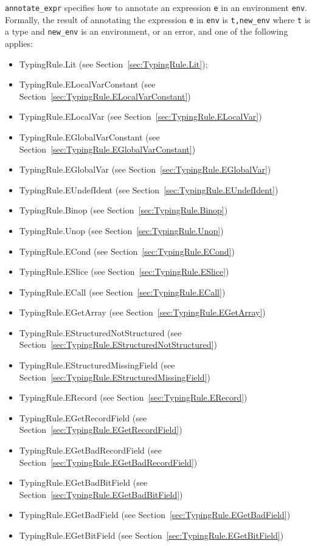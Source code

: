 \documentclass{book}
\begin{document}
\texttt{annotate\_expr} specifies how to annotate an expression \texttt{e} in
an environment \texttt{env}.  Formally, the result of annotating the expression
\texttt{e} in \texttt{env} is \texttt{t,new\_env} where \texttt{t} is a type and
\texttt{new\_env} is an environment, or an error, and one of the following applies:
\begin{itemize}
\item TypingRule.Lit (see Section~\ref{sec:TypingRule.Lit});
\item TypingRule.ELocalVarConstant (see Section~\ref{sec:TypingRule.ELocalVarConstant})
\item TypingRule.ELocalVar (see Section~\ref{sec:TypingRule.ELocalVar})
\item TypingRule.EGlobalVarConstant (see Section~\ref{sec:TypingRule.EGlobalVarConstant})
\item TypingRule.EGlobalVar (see Section~\ref{sec:TypingRule.EGlobalVar})
\item TypingRule.EUndefIdent (see Section~\ref{sec:TypingRule.EUndefIdent})
\item TypingRule.Binop (see Section~\ref{sec:TypingRule.Binop})
\item TypingRule.Unop (see Section~\ref{sec:TypingRule.Unop})
\item TypingRule.ECond (see Section~\ref{sec:TypingRule.ECond})
\item TypingRule.ESlice (see Section~\ref{sec:TypingRule.ESlice})
\item TypingRule.ECall (see Section~\ref{sec:TypingRule.ECall})
\item TypingRule.EGetArray (see Section~\ref{sec:TypingRule.EGetArray})
\item TypingRule.EStructuredNotStructured (see Section~\ref{sec:TypingRule.EStructuredNotStructured})
\item TypingRule.EStructuredMissingField (see Section~\ref{sec:TypingRule.EStructuredMissingField})
\item TypingRule.ERecord (see Section~\ref{sec:TypingRule.ERecord})
\item TypingRule.EGetRecordField (see Section~\ref{sec:TypingRule.EGetRecordField})
\item TypingRule.EGetBadRecordField (see Section~\ref{sec:TypingRule.EGetBadRecordField})
\item TypingRule.EGetBadBitField (see Section~\ref{sec:TypingRule.EGetBadBitField})
\item TypingRule.EGetBadField (see Section~\ref{sec:TypingRule.EGetBadField})
\item TypingRule.EGetBitField (see Section~\ref{sec:TypingRule.EGetBitField})

\end{itemize}
\end{document}
